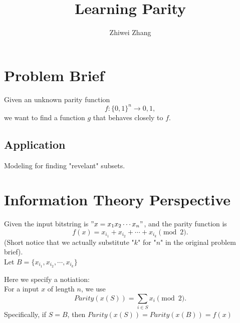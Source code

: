 \documentclass[12pt]{article}
\newenvironment{definition}[2][Definition]{\begin{trivlist}
		\item[\hskip \labelsep {\bfseries #1}\hskip \labelsep {\bfseries #2.}]}{\end{trivlist}}
\begin{document}
 
 
 
\title{Learning Parity}
\author{Zhiwei Zhang}
 
\maketitle
\section{Problem Brief}
Given an unknown parity function $$f : \{0, 1\} ^ n \to {0, 1},$$ we want to find a function $g$ that behaves closely to $f$. 

\subsection{Application}
Modeling for finding "revelant" subsets.

\section{Information Theory Perspective}
Given the input bitstring is $"x = x_1x_2 \cdots x_n"$, and the parity function is 
$$f(x) = x_{i_1} + x_{i_2} + \cdots + x_{i_k} \pmod 2 .$$
(Short notice that we actually substitute "$k$" for "$n$" in the original problem brief). \\
\newline
Let $B = \{x_{i_1} , x_{i_2} , \cdots , x_{i_k}\}$\\
\begin{definition}[Notation Definition]{}
Here we specify a notiation: \\
For a input $x$ of length $n$, we use 
$$Parity(x(S)) = \sum\limits_{i \in S}x_i \pmod 2.$$  
Specifically, if $S = B$, then $Parity(x(S)) = Parity(x(B)) = f(x)$
\end{definition}
\end{document}

